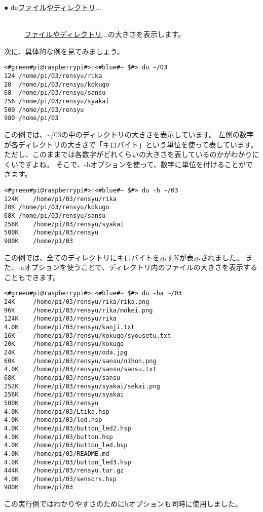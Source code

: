 \begin{description}
    \item[● \texttt{du}\textvisiblespace \underline{ファイルやディレクトリ}$\ldots$]\mbox{}\\
    \underline{ファイルやディレクトリ}$\ldots$の大きさを表示します。
\end{description}
次に、具体的な例を見てみましょう。
\begin{lstlisting}[caption=duコマンドの実行例, label=du_example]
<#green#pi@raspberrypi#>:<#blue#~ $#> du ~/03
124	/home/pi/03/rensyu/rika
20	/home/pi/03/rensyu/kokugo
68	/home/pi/03/rensyu/sansu
256	/home/pi/03/rensyu/syakai
500	/home/pi/03/rensyu
980	/home/pi/03
\end{lstlisting}
この例では、\textasciitilde/03の中のディレクトリの大きさを表示しています。
左側の数字が各ディレクトリの大きさで「キロバイト」という単位を使って表しています。
ただし、このままでは各数字がどれくらいの大きさを表しているのかがわかりにくいですよね。
そこで、-hオプションを使って、数字に単位を付けることができます。
\begin{lstlisting}[caption=du -hの実行例, label=du_example]
<#green#pi@raspberrypi#>:<#blue#~ $#> du -h ~/03
124K	/home/pi/03/rensyu/rika
20K	/home/pi/03/rensyu/kokugo
68K	/home/pi/03/rensyu/sansu
256K	/home/pi/03/rensyu/syakai
500K	/home/pi/03/rensyu
980K	/home/pi/03
\end{lstlisting}
この例では、全てのディレクトリにキロバイトを示すKが表示されました。
また、-aオプションを使うことで、ディレクトリ内のファイルの大きさを表示することもできます。
\begin{lstlisting}[caption=du -haの実行例, label=du_example]
<#green#pi@raspberrypi#>:<#blue#~ $#> du -ha ~/03
24K     /home/pi/03/rensyu/rika/rika.png
96K     /home/pi/03/rensyu/rika/mokei.png
124K	/home/pi/03/rensyu/rika
4.0K	/home/pi/03/rensyu/kanji.txt
16K     /home/pi/03/rensyu/kokugo/syousetu.txt
20K     /home/pi/03/rensyu/kokugo
24K     /home/pi/03/rensyu/oda.jpg
60K     /home/pi/03/rensyu/sansu/nihon.png
4.0K	/home/pi/03/rensyu/sansu/sansu.txt
68K     /home/pi/03/rensyu/sansu
252K	/home/pi/03/rensyu/syakai/sekai.png
256K	/home/pi/03/rensyu/syakai
500K	/home/pi/03/rensyu
4.0K	/home/pi/03/Ltika.hsp
4.0K	/home/pi/03/led.hsp
4.0K	/home/pi/03/button_led2.hsp
4.0K	/home/pi/03/button.hsp
4.0K	/home/pi/03/button_led.hsp
4.0K	/home/pi/03/README.md
4.0K	/home/pi/03/button_led3.hsp
444K	/home/pi/03/rensyu.tar.gz
4.0K	/home/pi/03/sensors.hsp
980K	/home/pi/03
\end{lstlisting}
この実行例ではわかりやすさのためにhオプションも同時に使用しました。

